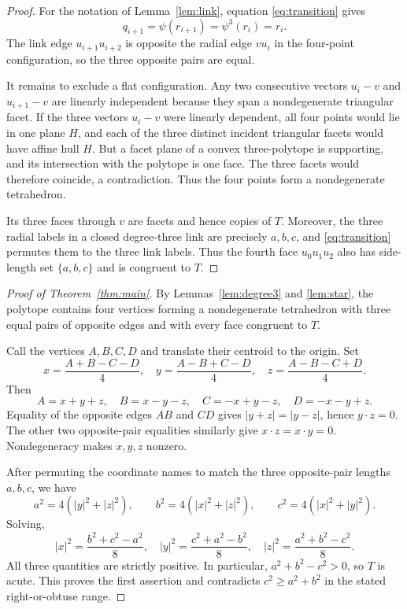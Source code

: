 \documentclass[11pt]{article}
\begin{document}
\begin{proof}
For the notation of Lemma~\ref{lem:link}, equation
\eqref{eq:transition} gives
\[
 q_{i+1}=\psi(r_{i+1})=\psi^3(r_i)=r_i.
\]
The link edge $u_{i+1}u_{i+2}$ is opposite the radial edge $vu_i$ in the
four-point configuration, so the three opposite pairs are equal.

It remains to exclude a flat configuration.  Any two consecutive vectors
$u_i-v$ and $u_{i+1}-v$ are linearly independent because they span a
nondegenerate triangular facet.  If the three vectors $u_i-v$ were linearly
dependent, all four points would lie in one plane $H$, and each of the three
distinct incident triangular facets would have affine hull $H$.  But a
facet plane of a convex three-polytope is supporting, and its intersection
with the polytope is one face.  The three facets would therefore coincide,
a contradiction.  Thus the four points form a nondegenerate tetrahedron.

Its three faces through $v$ are facets and hence copies of $T$.  Moreover,
the three radial labels in a closed degree-three link are precisely
$a,b,c$, and \eqref{eq:transition} permutes them to the three link labels.
Thus the fourth face $u_0u_1u_2$ also has side-length set $\{a,b,c\}$ and is
congruent to $T$.
\end{proof}

\begin{proof}[Proof of Theorem~\ref{thm:main}]
By Lemmas~\ref{lem:degree3} and \ref{lem:star}, the polytope contains four
vertices forming a nondegenerate tetrahedron with three equal pairs of
opposite edges and with every face congruent to $T$.

Call the vertices $A,B,C,D$ and translate their centroid to the origin.  Set
\[
 x=\frac{A+B-C-D}{4},\quad
 y=\frac{A-B+C-D}{4},\quad
 z=\frac{A-B-C+D}{4}.
\]
Then
\[
 A=x+y+z,\quad B=x-y-z,\quad
 C=-x+y-z,\quad D=-x-y+z.
\]
Equality of the opposite edges $AB$ and $CD$ gives
$|y+z|=|y-z|$, hence $y\cdot z=0$.  The other two opposite-pair equalities
similarly give $x\cdot z=x\cdot y=0$.  Nondegeneracy makes $x,y,z$ nonzero.

After permuting the coordinate names to match the three opposite-pair
lengths $a,b,c$, we have
\[
 a^2=4(|y|^2+|z|^2),\qquad
 b^2=4(|x|^2+|z|^2),\qquad
 c^2=4(|x|^2+|y|^2).
\]
Solving,
\begin{equation}\label{eq:disphenoid}
 |x|^2=\frac{b^2+c^2-a^2}{8},\quad
 |y|^2=\frac{c^2+a^2-b^2}{8},\quad
 |z|^2=\frac{a^2+b^2-c^2}{8}.
\end{equation}
All three quantities are strictly positive.  In particular,
$a^2+b^2-c^2>0$, so $T$ is acute.  This proves the first assertion and
contradicts $c^2\geq a^2+b^2$ in the stated right-or-obtuse range.
\end{proof}
\end{document}
